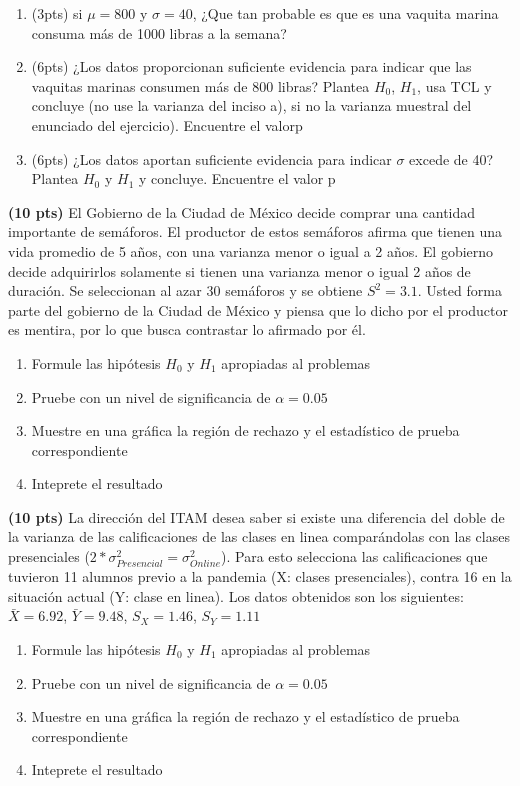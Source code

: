 \documentclass[addpoints]{exam}
\theoremstyle{mytheor}
\begin{document}
\begin{questions}
\begin{enumerate}[label=\Alph*)]
  \item  (3pts) si $\mu = 800$ y $\sigma = 40$, ¿Que tan probable es que es una vaquita marina consuma más de 1000 libras a la semana?
  \item (6pts) ¿Los datos proporcionan suficiente evidencia para indicar que las vaquitas marinas consumen más de 800 libras? Plantea $H_0$, $H_1$, usa TCL y concluye (no use la varianza del inciso a), si no la varianza muestral del enunciado del ejercicio). Encuentre el valorp
  \item (6pts) ¿Los datos aportan suficiente evidencia para indicar $\sigma$ excede de 40? Plantea $H_0$ y $H_1$ y concluye. Encuentre el valor p
  \end{enumerate}
  
 
 \question \textbf{(10 pts)} El Gobierno de la Ciudad de México decide comprar una cantidad importante de semáforos. El productor de estos semáforos afirma que tienen una vida promedio de 5 años, con una varianza menor o igual a 2 años. El gobierno decide adquirirlos solamente si tienen una varianza menor o igual 2 años de duración. Se seleccionan al azar 30 semáforos y se obtiene $S^2 = 3.1$. Usted forma parte del gobierno de la Ciudad de México y piensa que lo dicho por el productor es mentira, por lo que busca contrastar lo afirmado por él.

\begin{enumerate}
\item Formule las hipótesis $H_0$ y $H_1$ apropiadas al problemas
\item Pruebe con un nivel de significancia de $\alpha = 0.05$
\item Muestre en una gráfica la región de rechazo y el estadístico de prueba correspondiente
\item Inteprete el resultado
\end{enumerate}

\question \textbf{(10 pts)}
La dirección del ITAM desea saber si existe una diferencia del doble de la varianza de las calificaciones de las clases en linea comparándolas con las clases presenciales ($2*\sigma^2_{Presencial} = \sigma^2_{Online}$). Para esto selecciona las calificaciones que tuvieron 11 alumnos previo a la pandemia (X: clases presenciales), contra 16 en la situación actual (Y: clase en linea). Los datos obtenidos son los siguientes: $\bar{X} = 6.92$, $\bar{Y} = 9.48$, $S_{X} = 1.46$, $S_{Y} = 1.11$

\begin{enumerate}
\item Formule las hipótesis $H_0$ y $H_1$ apropiadas al problemas
\item Pruebe con un nivel de significancia de $\alpha = 0.05$
\item Muestre en una gráfica la región de rechazo y el estadístico de prueba correspondiente
\item Inteprete el resultado
\end{enumerate}


\end{questions}
\end{document}
